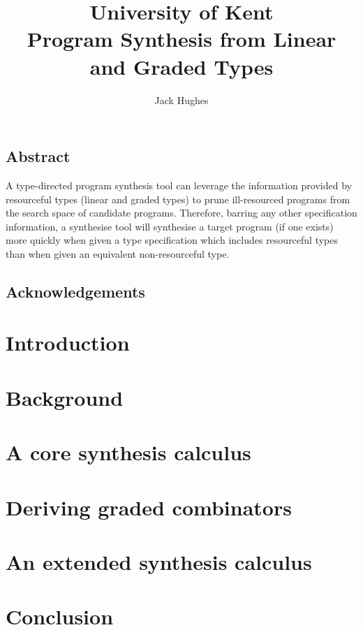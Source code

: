 \documentclass[12pt]{UoKthesis}
\theoremstyle{plain}%
\theoremstyle{definition}
\begin{document}
\normalsize
\title{University of Kent\\Program Synthesis from Linear and Graded Types}
\author{Jack Hughes}
\subject{computer science}

\begin{preface}
\section{Abstract}
A type-directed program synthesis tool can leverage the information provided by
resourceful types (linear and graded types) to prune ill-resourced programs from
the search space of candidate programs. Therefore, barring any other
specification information, a synthesise tool will synthesise a target program
(if one exists) more quickly when given a type specification which includes
resourceful types than when given an equivalent non-resourceful type.

\section{Acknowledgements}
\end{preface}

\chapter{Introduction}
\label{chapter:intro}


\chapter{Background}
\label{chapter:background}


\chapter{A core synthesis calculus}
\label{chapter:core}


\chapter{Deriving graded combinators}
\label{chapter:deriving}


\chapter{An extended synthesis calculus}
\label{chapter:extended}


\chapter{Conclusion}
\label{chapter:conclusion}


{}

\newpage
\appendix


\end{document}
